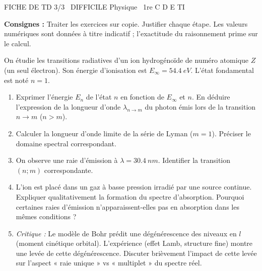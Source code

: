 \documentclass[11pt]{article}
\begin{document}
\begin{tcolorbox}[enhanced,colback=popink,colframe=popink,arc=10pt,boxrule=0pt,left=12pt,right=12pt,top=9pt,bottom=9pt]
{\color{white}\popxbold\small FICHE DE TD 3/3 \textbullet\ DIFFICILE \hfill Physique \textbullet\ 1re C D E TI\par}
\end{tcolorbox}
\vspace{4pt}
\noindent \textbf{Consignes :} Traiter les exercices sur copie. Justifier chaque étape. Les valeurs numériques sont données à titre indicatif ; l'exactitude du raisonnement prime sur le calcul.

\begin{exercice}
On étudie les transitions radiatives d'un ion hydrogénoïde de numéro atomique $Z$ (un seul électron). Son énergie d'ionisation est $E_\infty = \SI{54,4}{eV}$. L'état fondamental est noté $n=1$.
\begin{enumerate}
    \item Exprimer l'énergie $E_n$ de l'état $n$ en fonction de $E_\infty$ et $n$. En déduire l'expression de la longueur d'onde $\lambda_{n\to m}$ du photon émis lors de la transition $n \to m$ ($n>m$).
    \item Calculer la longueur d'onde limite de la série de Lyman ($m=1$). Préciser le domaine spectral correspondant.
    \item On observe une raie d'émission à $\lambda = \SI{30,4}{nm}$. Identifier la transition $(n; m)$ correspondante.
    \item L'ion est placé dans un gaz à basse pression irradié par une source continue. Expliquer qualitativement la formation du spectre d'absorption. Pourquoi certaines raies d'émission n'apparaissent-elles pas en absorption dans les mêmes conditions ?
    \item \textit{Critique :} Le modèle de Bohr prédit une dégénérescence des niveaux en $l$ (moment cinétique orbital). L'expérience (effet Lamb, structure fine) montre une levée de cette dégénérescence. Discuter brièvement l'impact de cette levée sur l'aspect « raie unique » vs « multiplet » du spectre réel.
\end{enumerate}
\end{exercice}
\end{document}
